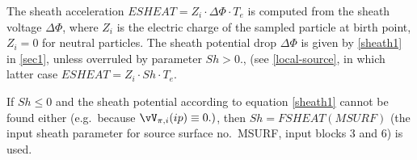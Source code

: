 The sheath acceleration $ESHEAT = Z_i \cdot \Delta \Phi \cdot T_e$  is computed
from the sheath voltage $\Delta \Phi$, where $Z_i$ is the electric charge of
the sampled particle at birth point, $Z_i=0$ for neutral particles.
The sheath potential drop $\Delta \Phi$ is given by \cref{sheath1} in
\cref{sec1}, unless overruled by parameter $Sh>0.
$, (see \cref{local-source}, in which latter case $ESHEAT=Z_i \cdot Sh \cdot
  T_e$.

If $Sh\leq 0$ and the sheath potential according to equation \cref{sheath1}
cannot be found either (e.g.\ because $\vV_{\pi,i}(ip) \equiv 0.)
$, then $Sh = FSHEAT(MSURF)$ (the input sheath parameter for source surface
no.\ MSURF, input blocks 3 and 6) is used.
